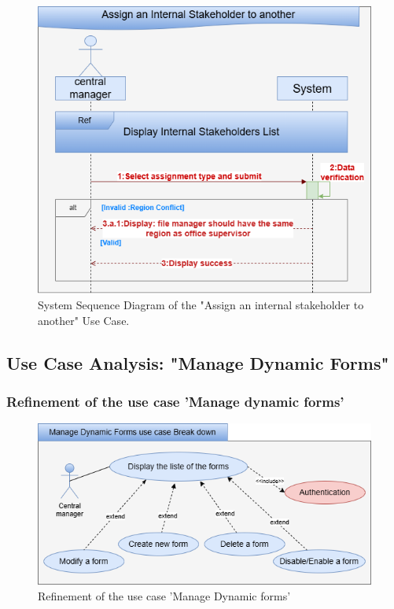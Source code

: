 \clearpage
\begin{figure}[h!]
    \centering
    \includegraphics[width=1\textwidth]{figures/seqassign internal stakeholders.png}
    \caption{System Sequence Diagram of the "Assign an internal stakeholder to another" Use Case.}
\end{figure}
\clearpage

\subsection{Use Case Analysis: "Manage Dynamic Forms"}
\subsubsection{Refinement of the use case 'Manage dynamic forms'}
\begin{figure}[h!]
    \centering
    \includegraphics[width=1\textwidth]{figures/bdmanages dynamic forms-Break down.png}
    \caption{Refinement of the use case 'Manage Dynamic forms'}
    \label{fig:image4}
\end{figure}\

